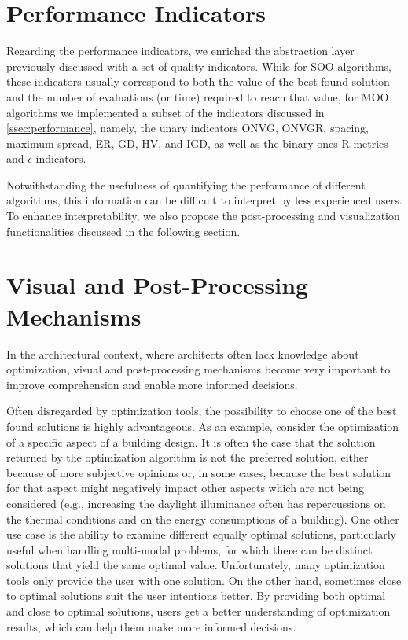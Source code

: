 \section{Performance Indicators}
Regarding the performance indicators, we enriched the abstraction layer previously discussed with a set of quality indicators. While for \ac{SOO} algorithms, these indicators usually correspond to both the value of the best found solution and the number of evaluations (or time) required to reach that value, for \ac{MOO} algorithms we implemented a subset of the indicators discussed in \cref{ssec:performance}, namely, the unary indicators \ac{ONVG}, \ac{ONVGR}, spacing, maximum spread, \ac{ER}, \ac{GD}, \ac{HV}, and \ac{IGD}, as well as the binary ones R-metrics and $\epsilon$ indicators.

Notwithstanding the usefulness of quantifying the performance of different algorithms, this information can be difficult to interpret by less experienced users. To enhance interpretability, we also propose the post-processing and visualization functionalities discussed in the following section.

\section{Visual and Post-Processing Mechanisms}
In the architectural context, where architects often lack knowledge about optimization, visual and post-processing mechanisms become very important to improve comprehension and enable more informed decisions. 

Often disregarded by optimization tools, the possibility to choose one of the best found solutions is highly advantageous. %
As an example, consider the optimization of a specific aspect of a building design. It is often the case that the solution returned by the optimization algorithm is not the preferred solution, either because of more subjective opinions or, in some cases, because the best solution for that aspect might negatively impact other aspects which are not being considered (e.g., increasing the daylight illuminance often has repercussions on the thermal conditions and on the energy consumptions of a building). One other use case is the ability to examine different equally optimal solutions, particularly useful when handling multi-modal problems, for which there can be distinct solutions that yield the same optimal value. Unfortunately, many optimization tools only provide the user with one solution. On the other hand, sometimes close to optimal solutions suit the user intentions better. By providing both optimal and close to optimal solutions, users get a better understanding of optimization results, which can help them make more informed decisions. 

